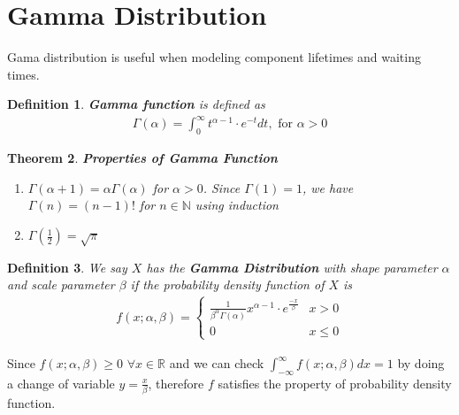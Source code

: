 \documentclass[11pt,oneside]{book}
\theoremstyle{newStyle}
\newtheorem{thm}{Theorem}[chapter]
\newtheorem{defn}[thm]{Definition}
\newcommand{\R}{\mathbb{R}}
\newcommand{\N}{\mathbb{N}}
\begin{document}
\section[Gamma Distribution]{Gamma Distribution}
Gama distribution is useful when modeling component lifetimes and waiting times. \begin{defn}
\textbf{Gamma function} is defined as \begin{align*}
\Gamma(\alpha)=\int_{0}^{\infty}t^{\alpha-1}\cdot e^{-t}dt,\text{ for }\alpha >0
\end{align*}
\end{defn}
\begin{thm}
\textbf{Properties of Gamma Function}\begin{enumerate}
\item $\Gamma(\alpha+1)=\alpha \Gamma(\alpha)$ for $\alpha >0$. Since $\Gamma(1)=1$, we have $\Gamma(n)=(n-1)!$ for $n\in \N$ using induction
\item $\Gamma(\frac{1}{2})=\sqrt{\pi}$
\end{enumerate}
\end{thm}
\begin{defn}
We say $X$ has the \textbf{Gamma Distribution} with shape parameter $\alpha$ and scale parameter $\beta$ if the probability density function of $X$ is \begin{align*}
f(x;\alpha,\beta)=\begin{cases}
\frac{1}{\beta^{\alpha}\Gamma(\alpha)}x^{\alpha-1}\cdot e^{\frac{-x}{\beta}} & x> 0\\
0 & x\leq 0
\end{cases}
\end{align*}
\end{defn}
Since $f(x;\alpha,\beta)\geq 0$ $\forall x\in \R$ and we can check $\int_{-\infty}^{\infty}f(x;\alpha,\beta)dx=1$ by doing a change of variable $y=\frac{x}{\beta}$, therefore $f$ satisfies the property of probability density function.\\
\hfill\\
\end{document}
